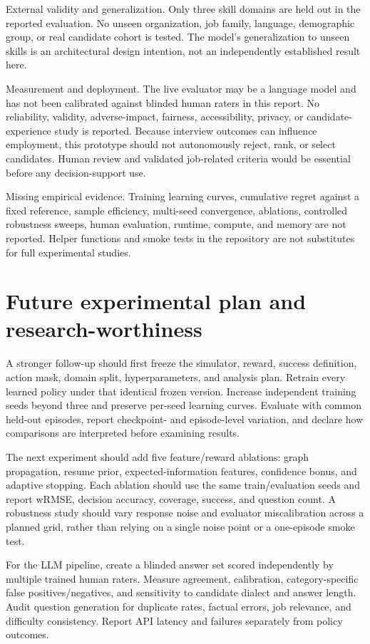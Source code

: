\documentclass{ieeeaccess}
\begin{document}
External validity and generalization. Only three skill domains are held out in the reported evaluation. No unseen organization, job family, language, demographic group, or real candidate cohort is tested. The model's generalization to unseen skills is an architectural design intention, not an independently established result here.

Measurement and deployment. The live evaluator may be a language model and has not been calibrated against blinded human raters in this report. No reliability, validity, adverse-impact, fairness, accessibility, privacy, or candidate-experience study is reported. Because interview outcomes can influence employment, this prototype should not autonomously reject, rank, or select candidates. Human review and validated job-related criteria would be essential before any decision-support use.

Missing empirical evidence. Training learning curves, cumulative regret against a fixed reference, sample efficiency, multi-seed convergence, ablations, controlled robustness sweeps, human evaluation, runtime, compute, and memory are not reported. Helper functions and smoke tests in the repository are not substitutes for full experimental studies.

\section{Future experimental plan and research-worthiness}

A stronger follow-up should first freeze the simulator, reward, success definition, action mask, domain split, hyperparameters, and analysis plan. Retrain every learned policy under that identical frozen version. Increase independent training seeds beyond three and preserve per-seed learning curves. Evaluate with common held-out episodes, report checkpoint- and episode-level variation, and declare how comparisons are interpreted before examining results.

The next experiment should add five feature/reward ablations: graph propagation, resume prior, expected-information features, confidence bonus, and adaptive stopping. Each ablation should use the same train/evaluation seeds and report wRMSE, decision accuracy, coverage, success, and question count. A robustness study should vary response noise and evaluator miscalibration across a planned grid, rather than relying on a single noise point or a one-episode smoke test.

For the LLM pipeline, create a blinded answer set scored independently by multiple trained human raters. Measure agreement, calibration, category-specific false positives/negatives, and sensitivity to candidate dialect and answer length. Audit question generation for duplicate rates, factual errors, job relevance, and difficulty consistency. Report API latency and failures separately from policy outcomes.
\end{document}
